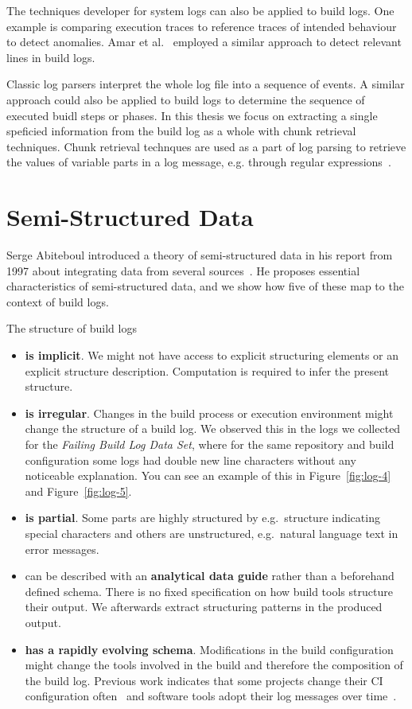 \documentclass[\myrootdir/main.tex]{subfiles}
\begin{document}
The techniques developer for system logs can also be applied to build logs.
One example is comparing execution traces to reference traces of intended behaviour to detect anomalies.
Amar et al.~\cite{amar2019mining} employed a similar approach to detect relevant lines in build logs.

Classic log parsers interpret the whole log file into a sequence of events.
A similar approach could also be applied to build logs to determine the sequence of executed buidl steps or phases.
In this thesis we focus on extracting a single speficied information from the build log as a whole with chunk retrieval techniques.
Chunk retrieval technques are used as a part of log parsing to retrieve the values of variable parts in a log message, e.g. through regular expressions~\cite{nagappan2010abstracting,xu2009detecting}.


\section{Semi-Structured Data}
\label{sec:rw-semi-structured-data}
Serge Abiteboul introduced a theory of semi-structured data in his report from 1997 about integrating data from several sources~\cite{abiteboul1997querying}.
He proposes essential characteristics of semi-structured data, and we show how five of these map to the context of build logs.

The structure of build logs
\begin{itemize}
  \item \textbf{is implicit}.
  We might not have access to explicit structuring elements or an explicit structure description.
  Computation is required to infer the present structure.
  \item \textbf{is irregular}.
  Changes in the build process or execution environment might change the structure of a build log.
  We observed this in the logs we collected for the \emph{Failing Build Log Data Set}, where for the same repository and build configuration some logs had double new line characters without any noticeable explanation.
  You can see an example of this in Figure~\ref{fig:log-4} and Figure~\ref{fig:log-5}.
  \item \textbf{is partial}. Some parts are highly structured by e.g.\ structure indicating special characters and others are unstructured, e.g.\ natural language text in error messages.
  \item can be described with an \textbf{analytical data guide} rather than a beforehand defined schema.
  There is no fixed specification on how build tools structure their output.
  We afterwards extract structuring patterns in the produced output.
  \item \textbf{has a rapidly evolving schema}.
  Modifications in the build configuration might change the tools involved in the build and therefore the composition of the build log.
  Previous work indicates that some projects change their CI configuration often~\cite{hilton2016usage} and software tools adopt their log messages over time~\cite{yuan2012characterizing}.
\end{itemize}
\end{document}
